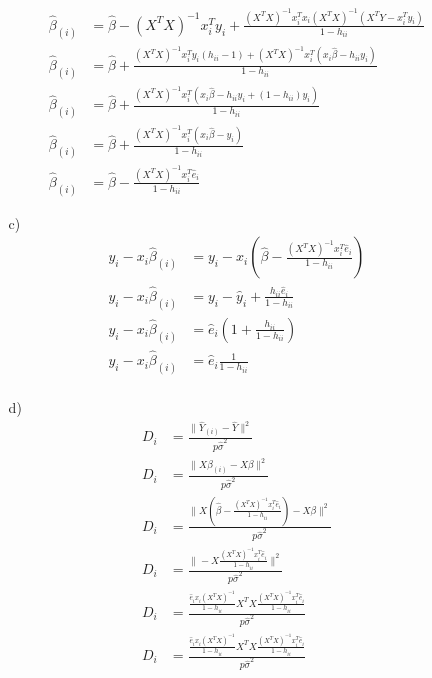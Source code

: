 \documentclass[11pt]{article}
\theoremstyle{definition}
\begin{document}
\begin{itemize}
\begin{itemize}
\begin{align*}
                    \hat \beta_{(i)} &= \hat \beta - (X^TX)^{-1}x_i^Ty_i + \frac{(X^TX)^{-1}x_i^Tx_i(X^TX)^{-1}\left(X^TY - x_i^T y_i\right)}{1-h_{ii}}   \\
                    \hat \beta_{(i)} &= \hat \beta + \frac{(X^TX)^{-1}x_i^Ty_i(h_{ii}-1) +(X^TX)^{-1}x_i^T\left(x_i\hat\beta - h_{ii}y_i\right)}{1-h_{ii}}   \\
                    \hat \beta_{(i)} &= \hat \beta + \frac{(X^TX)^{-1}x_i^T\left(x_i\hat\beta - h_{ii}y_i + (1-h_{ii})y_i\right)}{1-h_{ii}}   \\
                    \hat \beta_{(i)} &= \hat \beta + \frac{(X^TX)^{-1}x_i^T\left(x_i\hat\beta - y_i\right)}{1-h_{ii}} \\
                    \hat \beta_{(i)} &= \hat \beta - \frac{(X^TX)^{-1}x_i^T\hat e_i}{1-h_{ii}}   
                \end{align*}
            \item[c)]
                \begin{align*}
                    y_i - x_i\hat\beta_{(i)} &= y_i- x_i\left(\hat \beta - \frac{(X^TX)^{-1}x_i^T\hat e_i}{1-h_{ii}}\right) \\
                    y_i - x_i\hat\beta_{(i)} &= y_i  - \hat y_i + \frac{h_{ii}\hat e_i}{1-h_{ii}} \\
                    y_i - x_i\hat\beta_{(i)} &= \hat e_i \left(1+ \frac{h_{ii}}{1-h_{ii}}\right) \\
                    y_i - x_i\hat\beta_{(i)} &= \hat e_i \frac{1}{1-h_{ii}} \\
                \end{align*}
            \item[d)]
                \begin{align*}
                    D_i &= \frac{\|\hat Y_{(i)} - \hat Y\|^2}{p\hat\sigma^2} \\
                    D_i &= \frac{\|X\beta_{(i)} - X\beta\|^2}{p\hat\sigma^2} \\
                    D_i &= \frac{\|X\left(\hat \beta - \frac{(X^TX)^{-1}x_i^T\hat e_i}{1-h_{ii}}\right) - X\beta\|^2}{p\hat\sigma^2} \\
                    D_i &= \frac{\|- X\frac{(X^TX)^{-1}x_i^T\hat e_i}{1-h_{ii}}\|^2}{p\hat\sigma^2} \\
                    D_i &= \frac{\frac{\hat e_ix_i(X^TX)^{-1}}{1-h_{ii}}X^TX\frac{(X^TX)^{-1}x_i^T\hat e_i}{1-h_{ii}}}{p\hat\sigma^2} \\
                    D_i &= \frac{\frac{\hat e_ix_i(X^TX)^{-1}}{1-h_{ii}}X^TX\frac{(X^TX)^{-1}x_i^T\hat e_i}{1-h_{ii}}}{p\hat\sigma^2} \\

\end{align*}
\end{itemize}
\end{itemize}
\end{document}
